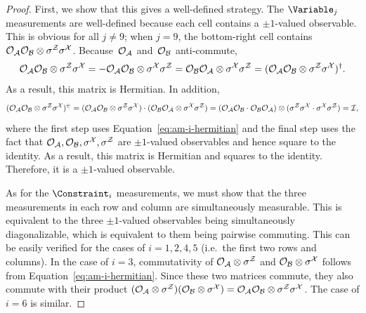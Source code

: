 \begin{proof}
  First, we show that this gives a well-defined strategy.
  The $\Variable_j$ measurements are well-defined because each cell contains a
  $\pm 1$-valued observable.
  This is obvious for all $j \neq 9$; when $j = 9$, the bottom-right cell
  contains $\cal{O}_A \cal{O}_B \otimes \sigma^Z \sigma^X$.
  Because~$\cal{O}_A$ and~$\cal{O}_B$ anti-commute,
  \begin{equation}\label{eq:am-i-hermitian}
  \cal{O}_A \cal{O}_B \otimes \sigma^Z \sigma^X
  = - \cal{O}_A \cal{O}_B \otimes \sigma^X \sigma^Z
  = \cal{O}_B \cal{O}_A \otimes \sigma^X \sigma^Z
  = (\cal{O}_A \cal{O}_B \otimes \sigma^Z \sigma^X)^\dagger.
  \end{equation}
  As a result, this matrix is Hermitian. In addition, 
  \begin{equation*}
  (\cal{O}_A \cal{O}_B \otimes \sigma^Z \sigma^X)^2
  = (\cal{O}_A \cal{O}_B \otimes \sigma^Z \sigma^X) \cdot (\cal{O}_B \cal{O}_A \otimes \sigma^X \sigma^Z)
  = (\cal{O}_A \cal{O}_B \cdot \cal{O}_B \cal{O}_A) \otimes (\sigma^Z \sigma^X \cdot \sigma^X \sigma^Z)
  = I,
  \end{equation*}
  where the first step uses Equation~\eqref{eq:am-i-hermitian} and the final
  step uses the fact that $\cal{O}_A, \cal{O}_B, \sigma^X, \sigma^Z$ are $\pm
  1$-valued observables and hence square to the identity.
  As a result, this matrix is Hermitian and squares to the identity.
  Therefore, it is a $\pm 1$-valued observable.
  
  As for the $\Constraint_i$ measurements,
  we must show that the three measurements in each row and column are simultaneously measurable.
  This is equivalent to the three $\pm 1$-valued observables being simultaneously diagonalizable,
  which is equivalent to them being pairwise commuting. This can be easily verified for the cases of $i = 1, 2, 4, 5$
  (i.e.\ the first two rows and columns).
  In the case of $i = 3$, commutativity of $\cal{O}_A \otimes \sigma^Z$ and $\cal{O}_B \otimes \sigma^X$ 
  follows from Equation~\eqref{eq:am-i-hermitian}.
  Since these two matrices commute, they also commute with their product 
  $(\cal{O}_A \otimes \sigma^Z)(\cal{O}_B \otimes \sigma^X) = \cal{O}_A \cal{O}_B \otimes \sigma^Z \sigma^X$.
  The case of $i = 6$ is similar.
  

\end{proof}
